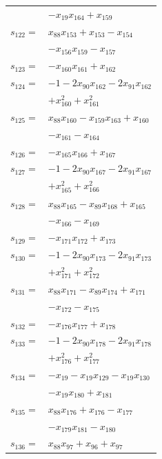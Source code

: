 \begin{longtable}{@{}r@{\;}l@{}}
 & \(\displaystyle -x_{19}x_{164} +x_{159}\) \\[3pt]
\(s_{122}=\) & \(\displaystyle x_{88}x_{153} +x_{153} -x_{154}\) \\
 & \(\displaystyle -x_{156}x_{159} -x_{157}\) \\[3pt]
\(s_{123}=\) & \(\displaystyle -x_{160}x_{161} +x_{162}\) \\[3pt]
\(s_{124}=\) & \(\displaystyle -1 -2x_{90}x_{162} -2x_{91}x_{162}\) \\
 & \(\displaystyle +x_{160}^{2} +x_{161}^{2}\) \\[3pt]
\(s_{125}=\) & \(\displaystyle x_{88}x_{160} -x_{159}x_{163} +x_{160}\) \\
 & \(\displaystyle -x_{161} -x_{164}\) \\[3pt]
\(s_{126}=\) & \(\displaystyle -x_{165}x_{166} +x_{167}\) \\[3pt]
\(s_{127}=\) & \(\displaystyle -1 -2x_{90}x_{167} -2x_{91}x_{167}\) \\
 & \(\displaystyle +x_{165}^{2} +x_{166}^{2}\) \\[3pt]
\(s_{128}=\) & \(\displaystyle x_{88}x_{165} -x_{89}x_{168} +x_{165}\) \\
 & \(\displaystyle -x_{166} -x_{169}\) \\[3pt]
\(s_{129}=\) & \(\displaystyle -x_{171}x_{172} +x_{173}\) \\[3pt]
\(s_{130}=\) & \(\displaystyle -1 -2x_{90}x_{173} -2x_{91}x_{173}\) \\
 & \(\displaystyle +x_{171}^{2} +x_{172}^{2}\) \\[3pt]
\(s_{131}=\) & \(\displaystyle x_{88}x_{171} -x_{89}x_{174} +x_{171}\) \\
 & \(\displaystyle -x_{172} -x_{175}\) \\[3pt]
\(s_{132}=\) & \(\displaystyle -x_{176}x_{177} +x_{178}\) \\[3pt]
\(s_{133}=\) & \(\displaystyle -1 -2x_{90}x_{178} -2x_{91}x_{178}\) \\
 & \(\displaystyle +x_{176}^{2} +x_{177}^{2}\) \\[3pt]
\(s_{134}=\) & \(\displaystyle -x_{19} -x_{19}x_{129} -x_{19}x_{130}\) \\
 & \(\displaystyle -x_{19}x_{180} +x_{181}\) \\[3pt]
\(s_{135}=\) & \(\displaystyle x_{88}x_{176} +x_{176} -x_{177}\) \\
 & \(\displaystyle -x_{179}x_{181} -x_{180}\) \\[3pt]
\(s_{136}=\) & \(\displaystyle x_{88}x_{97} +x_{96} +x_{97}\) \\

\end{longtable}
